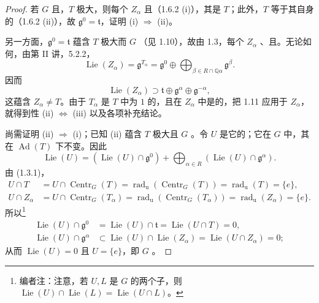 \begin{proof}
若 $G$ 且，$T$ 极大，则每个 $Z_\alpha$ 且（1.6.2 (i)），其是 $T$；此外，$T$ 等于其自身的（1.6.2 (ii)），故 $\mathfrak g^0=\mathfrak t$，证明 (i) $\Rightarrow$ (ii)。

另一方面，$\mathfrak g^0=\mathfrak t$ 蕴含 $T$ 极大而 $G$ （见 1.10），故由 1.3，每个 $Z_\alpha$ 、且。无论如何，由第 II 讲，5.2.2，
\[
\operatorname{Lie}(Z_\alpha)=\mathfrak g^{T_\alpha}=\mathfrak g^0\oplus\bigoplus_{\beta\in R\cap\mathbb Q\alpha}\mathfrak g^\beta.
\]
因而
\[
\operatorname{Lie}(Z_\alpha)\supset\mathfrak t\oplus\mathfrak g^\alpha\oplus\mathfrak g^{-\alpha},
\]
这蕴含 $Z_\alpha\ne T$。由于 $T_\alpha$ 是 $T$ 中为 $1$ 的，且在 $Z_\alpha$ 中是的，把 1.11 应用于 $Z_\alpha$，就得到性 (ii) $\Leftrightarrow$ (iii) 以及各项补充结论。

尚需证明 (ii) $\Rightarrow$ (i)；已知 (ii) 蕴含 $T$ 极大且 $G$ 。令 $U$ 是它的；它在 $G$ 中，其 在 $\operatorname{Ad}(T)$ 下不变。因此
\[
\operatorname{Lie}(U)=(\operatorname{Lie}(U)\cap\mathfrak g^0)+\bigoplus_{\alpha\in R}(\operatorname{Lie}(U)\cap\mathfrak g^\alpha).
\]
由 (1.3.1)，
\begin{align*}
U\cap T&=U\cap\operatorname{Centr}_G(T)=\operatorname{rad}_{\mathrm u}(\operatorname{Centr}_G(T))=\operatorname{rad}_{\mathrm u}(T)=\{e\},\\
U\cap Z_\alpha&=U\cap\operatorname{Centr}_G(T_\alpha)=\operatorname{rad}_{\mathrm u}(\operatorname{Centr}_G(T_\alpha))=\operatorname{rad}_{\mathrm u}(Z_\alpha)=\{e\}.
\end{align*}
所以\footnote[12]{编者注：注意，若 $U,L$ 是 $G$ 的两个子，则 $\operatorname{Lie}(U)\cap\operatorname{Lie}(L)=\operatorname{Lie}(U\cap L)$。}
\begin{align*}
\operatorname{Lie}(U)\cap\mathfrak g^0&=\operatorname{Lie}(U)\cap\mathfrak t=\operatorname{Lie}(U\cap T)=0,\\
\operatorname{Lie}(U)\cap\mathfrak g^\alpha&\subset\operatorname{Lie}(U)\cap\operatorname{Lie}(Z_\alpha)=\operatorname{Lie}(U\cap Z_\alpha)=0;
\end{align*}
从而 $\operatorname{Lie}(U)=0$ 且 $U=\{e\}$，即 $G$ 。
\end{proof}
